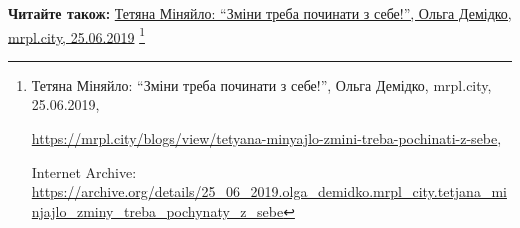  
 
 
 
 

\def\pubIA{https://archive.org/details/25_06_2019.olga_demidko.mrpl_city.tetjana_minjajlo_zminy_treba_pochynaty_z_sebe}
\def\pubTitle{Тетяна Міняйло: \enquote{Зміни треба починати з себе!}}
\def\pubDate{25.06.2019}
\def\pubOrigin{https://mrpl.city/blogs/view/tetyana-minyajlo-zmini-treba-pochinati-z-sebe}
\def\pubAuthor{Ольга Демідко}

\textbf{Читайте також:} \href{\pubIA}{%
\pubTitle, \pubAuthor, mrpl.city, \pubDate}%
\footnote{\pubTitle, \pubAuthor, mrpl.city, \pubDate, \par\url{\pubOrigin}, \par Internet Archive: \url{\pubIA}}
